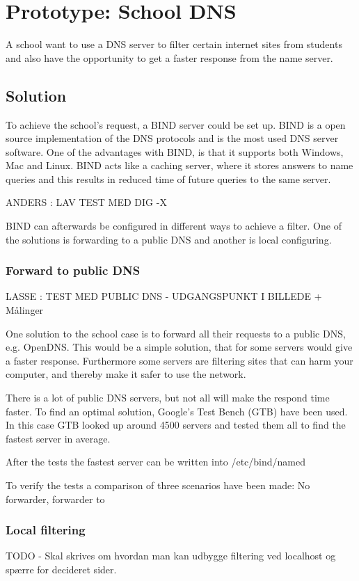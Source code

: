\documentclass[Preamble]{subfiles}
\begin{document}
\chapter{Prototype: School DNS}
A school want to use a DNS server to filter certain internet sites from students and also have the opportunity to get a faster response from the name server. 

\section{Solution}
To achieve the school's request, a BIND server could be set up. BIND is a open source implementation of the DNS protocols and is the most used DNS server software. One of the advantages with BIND, is that it supports both Windows, Mac and Linux. BIND acts like a caching server, where it stores answers to name queries and this results in reduced time of future queries to the same server.

ANDERS : LAV TEST MED DIG -X

BIND can afterwards be configured in different ways to achieve a filter. One of the solutions is forwarding to a public DNS and another is local configuring.

\subsection{Forward to public DNS}

LASSE : TEST MED PUBLIC DNS - UDGANGSPUNKT I BILLEDE + Målinger

One solution to the school case is to forward all their requests to a public DNS, e.g. OpenDNS. This would be a simple solution, that for some servers would give a faster response. Furthermore some servers are filtering sites that can harm your computer, and thereby make it safer to use the network.

There is a lot of public DNS servers, but not all will make the respond time faster. To find  an optimal solution, Google's Test Bench (GTB) have been used. In this case GTB looked up around 4500 servers and tested them all to find the fastest server in average.

After the tests the fastest server can be written into /etc/bind/named

To verify the tests a comparison of three scenarios have been made: No forwarder, forwarder to

\subsection{Local filtering}
TODO - Skal skrives om hvordan man kan udbygge filtering ved localhost og spærre for decideret sider. 
\end{document}
